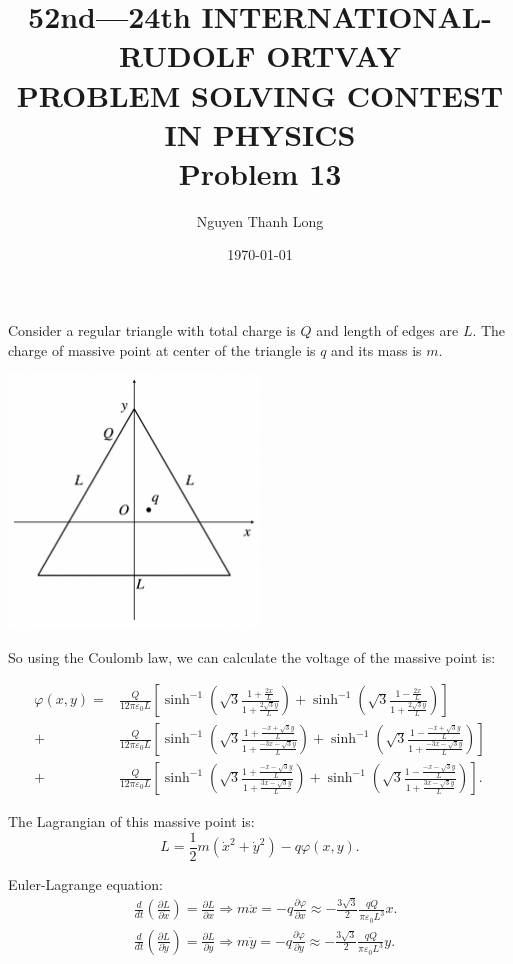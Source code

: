 \documentclass[12pt]{article}
\title{52nd—24th INTERNATIONAL-RUDOLF ORTVAY \\ PROBLEM SOLVING CONTEST IN PHYSICS \\ Problem 13}
\author{Nguyen Thanh Long}
\date{\today}
\begin{document}
	
\maketitle

\noindent Consider a regular triangle with total charge is $Q$ and length of edges are $L$. The charge of massive point at center of the triangle is $q$ and its mass is $m$.

\begin{center}
	\includegraphics[width=0.5\textwidth]{Fig_P13.png}
\end{center}

\noindent So using the Coulomb law, we can calculate the voltage of the massive point is:	
	
\begin{align*}
	\varphi (x,y)= & \frac{Q}{12 \pi \varepsilon_0 L} \left[ \sinh^{-1} \left( \sqrt{3} \frac{1 + \frac{2x}{L}}{1 + \frac{2\sqrt{3}y}{L}} \right) + \sinh^{-1} \left( \sqrt{3} \frac{1 - \frac{2x}{L}}{1 + \frac{2\sqrt{3}y}{L}} \right) \right] \\
	+ & \frac{Q}{12 \pi \varepsilon_0 L} \left[ \sinh^{-1} \left( \sqrt{3} \frac{1 + \frac{-x + \sqrt{3} y}{L}}{1 + \frac{-3x -\sqrt{3}y}{L}} \right) + \sinh^{-1} \left( \sqrt{3} \frac{1 - \frac{-x + \sqrt{3} y}{L}}{1 + \frac{-3x -\sqrt{3}y}{L}} \right) \right] \\
	+ & \frac{Q}{12 \pi \varepsilon_0 L} \left[ \sinh^{-1} \left( \sqrt{3} \frac{1 + \frac{-x - \sqrt{3}y}{L}}{1 + \frac{3x - \sqrt{3}y}{L}} \right) + \sinh^{-1} \left( \sqrt{3} \frac{1 - \frac{-x - \sqrt{3}y}{L}}{1 + \frac{3x - \sqrt{3}y}{L}} \right) \right] .
\end{align*}	

\noindent The Lagrangian of this massive point is:
$$ L = \frac{1}{2} m \left( \dot{x}^2 + \dot{y}^2 \right) - q \varphi (x,y) .$$
	
\noindent Euler-Lagrange equation:
\begin{align*}
	& \frac{d}{dt} \left( \frac{ \partial L}{\partial \dot{x} } \right) = \frac{\partial L}{\partial x} \Rightarrow m \ddot{x} = - q \frac{\partial \varphi}{\partial x} \approx - \frac{3\sqrt{3}}{2} \frac{qQ}{\pi \varepsilon_0 L^3} x. \\
	& \frac{d}{dt} \left( \frac{ \partial L}{\partial \dot{y} } \right) = \frac{\partial L}{\partial y} \Rightarrow m \ddot{y} = - q \frac{\partial \varphi}{\partial y} \approx - \frac{3\sqrt{3}}{2} \frac{qQ}{\pi \varepsilon_0 L^3} y.
\end{align*}
\end{document}

